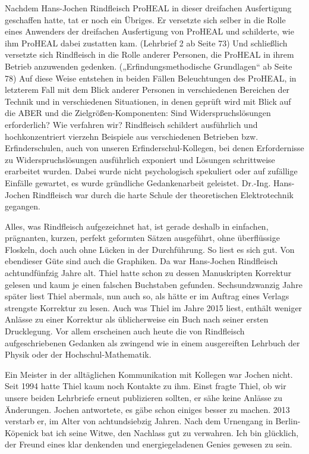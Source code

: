 \documentclass[12pt,a4paper]{article}
\begin{document}
Nachdem Hans-Jochen Rindfleisch ProHEAL in dieser dreifachen Ausfertigung
geschaffen hatte, tat er noch ein Übriges. Er versetzte sich selber in die
Rolle eines Anwenders der dreifachen Ausfertigung von ProHEAL und schilderte,
wie ihm ProHEAL dabei zustatten kam. (Lehrbrief 2 ab Seite 73) Und schließlich
versetzte sich Rindfleisch in die Rolle anderer Personen, die ProHEAL in ihrem
Betrieb anzuwenden gedenken. („Erfindungsmethodische Grundlagen“ ab Seite 78)
Auf diese Weise entstehen in beiden Fällen Beleuchtungen des ProHEAL, in
letzterem Fall mit dem Blick anderer Personen in verschiedenen Bereichen der
Technik und in verschiedenen Situationen, in denen geprüft wird mit Blick auf
die ABER und die Zielgrößen-Komponenten: Sind Widerspruchslösungen
erforderlich? Wie verfahren wir? Rindfleisch schildert ausführlich und
hochkonzentriert vierzehn Beispiele aus verschiedenen Betrieben bzw.
Erfinderschulen, auch von unseren Erfinderschul-Kollegen, bei denen
Erfordernisse zu Widerspruchslösungen ausführlich exponiert und Lösungen
schrittweise erarbeitet wurden. Dabei wurde nicht psychologisch spekuliert oder
auf zufällige Einfälle gewartet, es wurde gründliche Gedankenarbeit geleistet.
Dr.-Ing. Hans-Jochen Rindfleisch war durch die harte Schule der theoretischen
Elektrotechnik gegangen.

Alles, was Rindfleisch aufgezeichnet hat, ist gerade deshalb in einfachen,
prägnanten, kurzen, perfekt geformten Sätzen ausgeführt, ohne überflüssige
Floskeln, doch auch ohne Lücken in der Durchführung. So liest es sich gut. Von
ebendieser Güte sind auch die Graphiken. Da war Hans-Jochen Rindfleisch
achtundfünfzig Jahre alt. Thiel hatte schon zu dessen Manuskripten Korrektur
gelesen und kaum je einen falschen Buchstaben gefunden. Sechsundzwanzig Jahre
später liest Thiel abermals, nun auch so, als hätte er im Auftrag eines Verlags
strengste Korrektur zu lesen. Auch was Thiel im Jahre 2015 liest, enthält
weniger Anlässe zu einer Korrektur als üblicherweise ein Buch nach seiner
ersten Drucklegung. Vor allem erscheinen auch heute die von Rindfleisch
aufgeschriebenen Gedanken als zwingend wie in einem ausgereiften Lehrbuch der
Physik oder der Hochschul-Mathematik.

Ein Meister in der alltäglichen Kommunikation mit Kollegen war Jochen nicht.
Seit 1994 hatte Thiel kaum noch Kontakte zu ihm. Einst fragte Thiel, ob wir
unsere beiden Lehrbriefe erneut publizieren sollten, er sähe keine Anlässe zu
Änderungen. Jochen antwortete, es gäbe schon einiges besser zu machen. 2013
verstarb er, im Alter von achtundsiebzig Jahren. Nach dem Urnengang in
Berlin-Köpenick bat ich seine Witwe, den Nachlass gut zu verwahren. Ich bin
glücklich, der Freund eines klar denkenden und energiegeladenen Genies gewesen
zu sein.
\end{document}
